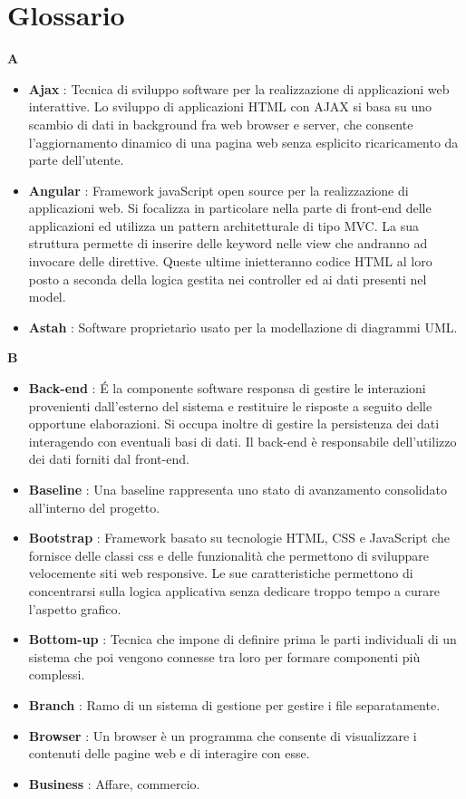 \section{Glossario}
{\huge \textbf{A}}
\begin{flushleft}
\begin{itemize}[label={}]
\item \textbf{Ajax} : Tecnica di sviluppo software per la realizzazione di applicazioni web interattive. Lo sviluppo di applicazioni HTML con AJAX si basa su uno scambio di dati in background fra web browser e server, che consente l'aggiornamento dinamico di una pagina web senza esplicito ricaricamento da parte dell'utente.
\item \textbf{Angular} : Framework javaScript open source per la realizzazione di applicazioni web. Si focalizza in particolare nella parte di front-end delle applicazioni ed utilizza un pattern architetturale di tipo MVC. La sua struttura permette di inserire delle keyword nelle view che andranno ad invocare delle direttive. Queste ultime inietteranno codice HTML al loro posto a seconda della logica gestita nei controller ed ai dati presenti nel model.
\item \textbf{Astah} : Software proprietario usato per la modellazione di diagrammi UML.
\end{itemize}
\end{flushleft}
\newpage
{\huge \textbf{B}}
\begin{flushleft}
\begin{itemize}[label={}]
\item \textbf{Back-end} : \'E la componente software responsa di gestire le interazioni provenienti dall'esterno del sistema e restituire le risposte a seguito delle opportune elaborazioni. Si occupa inoltre di gestire la persistenza dei dati interagendo con eventuali basi di dati. Il back-end è responsabile dell'utilizzo dei dati forniti dal front-end.
\item \textbf{Baseline} : Una baseline rappresenta uno stato di avanzamento consolidato all'interno del progetto.
\item \textbf{Bootstrap} : Framework basato su tecnologie HTML, CSS e JavaScript che fornisce delle classi css e delle funzionalità che permettono di sviluppare velocemente siti web responsive. Le sue caratteristiche permettono di concentrarsi sulla logica applicativa senza dedicare troppo tempo a curare l'aspetto grafico.
\item \textbf{Bottom-up} : Tecnica che impone di definire prima le parti individuali di un sistema che poi vengono connesse tra loro per formare componenti più complessi.
\item \textbf{Branch} : Ramo di un sistema di gestione per gestire i file separatamente.
\item \textbf{Browser} : Un browser è un programma che consente di visualizzare i contenuti delle pagine web e di interagire con esse.
\item \textbf{Business} : Affare, commercio.
\end{itemize}
\end{flushleft}
